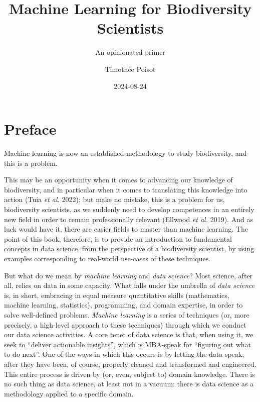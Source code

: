 \documentclass[
  letterpaper,
]{scrbook}
\title{Machine Learning for Biodiversity Scientists}
\subtitle{An opinionated primer}
\author{Timothée Poisot}
\date{2024-08-24}
\renewcommand*\contentsname{Table of contents}
\newcommand\contentsname{Table of contents}
\begin{document}
\frontmatter
\maketitle

\renewcommand*\contentsname{Table of contents}
{
\hypersetup{linkcolor=}
\setcounter{tocdepth}{2}
\tableofcontents
}

\mainmatter
{}\label{preface}

\chapter*{Preface}


Machine learning is now an established methodology to study
biodiversity, and this is a problem.

This may be an opportunity when it comes to advancing our knowledge of
biodiversity, and in particular when it comes to translating this
knowledge into action (Tuia \emph{et al.} 2022); but make no mistake,
this is a problem for us, biodiversity scientists, as we suddenly need
to develop competences in an entirely new field in order to remain
professionally relevant (Ellwood \emph{et al.} 2019). And as luck would
have it, there are easier fields to master than machine learning. The
point of this book, therefore, is to provide an introduction to
fundamental concepts in data science, from the perspective of a
biodiversity scientist, by using examples corresponding to real-world
use-cases of these techniques.

But what do we mean by \emph{machine learning} and \emph{data science}?
Most science, after all, relies on data in some capacity. What falls
under the umbrella of \emph{data science} is, in short, embracing in
equal measure quantitative skills (mathematics, machine learning,
statistics), programming, and domain expertise, in order to solve
well-defined problems. \emph{Machine learning} is a series of techniques
(or, more precisely, a high-level approach to these techniques) through
which we conduct our data science activities. A core tenet of data
science is that, when using it, we seek to ``deliver actionable
insights'', which is MBA-speak for ``figuring out what to do next''. One
of the ways in which this occurs is by letting the data speak, after
they have been, of course, properly cleaned and transformed and
engineered. This entire process is driven by (or, even, subject to)
domain knowledge. There is no such thing as data science, at least not
in a vacuum: there is data science as a methodology applied to a
specific domain.
\end{document}
